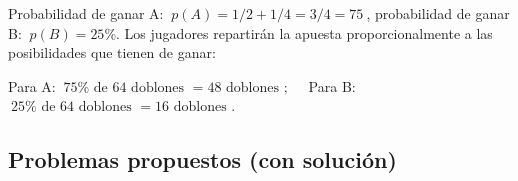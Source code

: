 Probabilidad de ganar A: $\ p(A)=1/2+1/4=3/4=75\ $, probabilidad de ganar B: $\ p(B)=25\%$. Los jugadores repartirán la apuesta proporcionalmente a las posibilidades que tienen de ganar:

Para A: $\ 75\% \text{ de } 64 \text{\ doblones\ }= 48 \text{\ doblones\ };\quad $ Para B: $\ 25\% \text{ de } 64 \text{\ doblones\ } = 16 \text{\ doblones }$.

\subsection{Problemas propuestos (con solución)}

